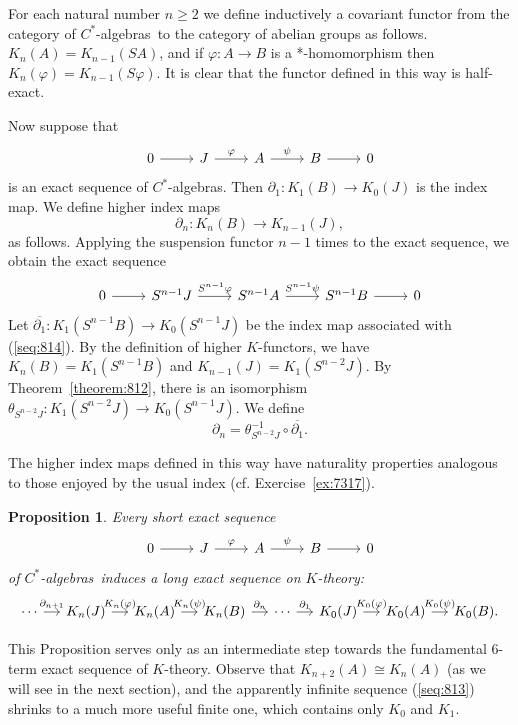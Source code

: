 \documentclass{book}
\newtheorem{proposition}[definition]{Proposition}
\def\cstars{\(C^*\)-algebras}
\begin{document}
For each natural number \(n\geq 2\) we define inductively a covariant functor from the category of \cstars\ to the 
category of abelian groups as follows. \(K_n(A)=K_{n-1}(S A)\), and if \(\varphi:A\rightarrow B\) is a *-homomorphism then
\(K_{n}(\varphi)=K_{n-1}(S \varphi)\). It is clear that the functor defined in this way is half-exact.\par
Now suppose that
\begin{equation*}
  \begin{tikzcd}
    0\arrow[r]&J \arrow[r,"\varphi"]&A\arrow[r,"\psi"]&B\arrow[r]&0
  \end{tikzcd}
\end{equation*}
is an exact sequence of \cstars. Then \(\partial_1:K_1(B)\rightarrow K_{0}(J)\) is the index map.
We define higher index maps
\[
  \partial_n:K_n(B)\rightarrow K_{n-1}(J),
\]
as follows. Applying the suspension functor \(n-1\) times to the exact sequence, we obtain the exact sequence
\begin{equation}\label{seq:814}
  \begin{tikzcd}
    0\arrow[r]&S^{n-1} J \arrow[r,"S^{n-1}\varphi"]&S^{n-1}A\arrow[r,"S^{n-1}\psi"]&S^{n-1}B\arrow[r]&0
  \end{tikzcd}
\end{equation}  
Let \(\overline{\partial_1}:K_1(S^{n-1}B)\rightarrow K_0(S^{n-1}J)\) be the index map associated with (\ref{seq:814}).
By the definition of higher \(K\)-functors, we have \(K_n(B)=K_1(S^{n-1}B)\) and \(K_{n-1}(J)=K_1(S^{n-2}J)\).
By Theorem~\ref{theorem:812}, there is an isomorphism \(\theta_{S^{n-2}J}:K_1(S^{n-2}J)\rightarrow K_0(S^{n-1}J)\). We define
\[
  \partial_n=\theta^{-1}_{S^{n-2}J}\circ \overline{\partial_1}.
\]\par
The higher index maps defined in this way have naturality properties analogous to those enjoyed by the
usual index (cf. Exercise~\ref{ex:7317}).
\begin{proposition}
  Every short exact sequence 
  \begin{equation*}
  \begin{tikzcd}
    0\arrow[r]&J \arrow[r,"\varphi"]&A\arrow[r,"\psi"]&B\arrow[r]&0
  \end{tikzcd}
\end{equation*}
of \cstars\ induces a long exact sequence on \(K\)-theory:
\begin{equation}\label{seq:813}
  \begin{tikzcd}[column sep=small]
    \cdots\arrow[r,"\partial_{n+1}"]&K_n(J) \arrow[r,"K_n(\varphi)"]&K_n(A)\arrow[r,"K_n(\psi)"]&K_n(B)\arrow[r,"\partial_{n}"]&\cdots\arrow[r,"\partial_1"]&K_0(J)\arrow[r,"K_0(\varphi)"]&K_0(A)\arrow[r,"K_0(\psi)"]&K_0(B).
  \end{tikzcd}
\end{equation}  
\end{proposition}\par
This Proposition serves only as an intermediate step towards the fundamental 6-term exact sequence of \(K\)-theory.
Observe that \(K_{n+2}(A)\cong K_n(A)\) (as we will see in the next section), and the apparently infinite sequence (\ref{seq:813}) shrinks to a much more useful finite one, which contains only \(K_0\) and \(K_1\).
\end{document}
